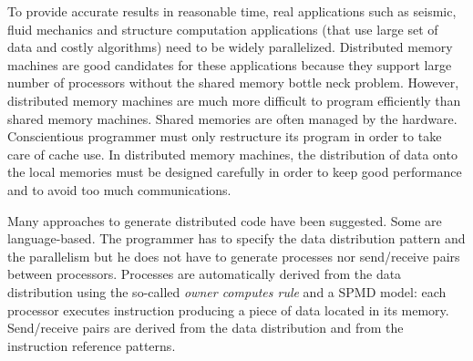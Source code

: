 

%


To provide accurate results in reasonable time, real applications such
as seismic, fluid mechanics and structure computation applications (that
use large set of data and costly algorithms) need to be widely
parallelized. Distributed memory machines are good candidates for these
applications because they support large number of processors without
the shared memory bottle neck problem.  However, distributed memory machines
are much more difficult to program efficiently than shared memory machines.  Shared memories are
often managed by the hardware. Conscientious programmer must only
restructure its program in order to take care of  cache use.
In distributed memory machines, the distribution of data onto the local 
memories must be designed  carefully in order to keep good performance and 
to avoid too much communications.

Many approaches to generate distributed code have been suggested.
Some are language-based. The programmer has to specify the data
distribution pattern and the parallelism but he does not have to
generate processes nor send/receive pairs between processors.
Processes are automatically derived from the data distribution using
the so-called {\em owner computes rule} and a SPMD model: each
processor executes instruction producing a piece of data located in
its memory.  Send/recei\-ve pairs are derived from the data
distribution and from the instruction reference patterns.


